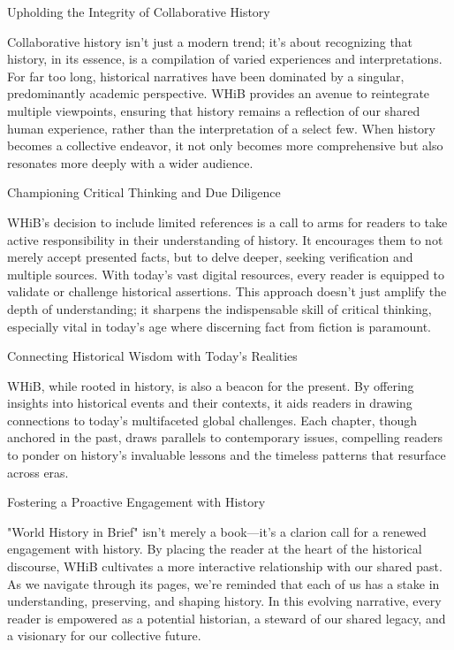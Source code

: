 \documentclass[a4paper,12pt]{book}
\begin{document}
Upholding the Integrity of Collaborative History

Collaborative history isn't just a modern trend; it's about recognizing that history, in its essence, is a compilation of varied experiences and interpretations. For far too long, historical narratives have been dominated by a singular, predominantly academic perspective. WHiB provides an avenue to reintegrate multiple viewpoints, ensuring that history remains a reflection of our shared human experience, rather than the interpretation of a select few. When history becomes a collective endeavor, it not only becomes more comprehensive but also resonates more deeply with a wider audience.

Championing Critical Thinking and Due Diligence

WHiB's decision to include limited references is a call to arms for readers to take active responsibility in their understanding of history. It encourages them to not merely accept presented facts, but to delve deeper, seeking verification and multiple sources. With today's vast digital resources, every reader is equipped to validate or challenge historical assertions. This approach doesn't just amplify the depth of understanding; it sharpens the indispensable skill of critical thinking, especially vital in today's age where discerning fact from fiction is paramount.

Connecting Historical Wisdom with Today's Realities

WHiB, while rooted in history, is also a beacon for the present. By offering insights into historical events and their contexts, it aids readers in drawing connections to today's multifaceted global challenges. Each chapter, though anchored in the past, draws parallels to contemporary issues, compelling readers to ponder on history's invaluable lessons and the timeless patterns that resurface across eras.

Fostering a Proactive Engagement with History

"World History in Brief" isn't merely a book—it's a clarion call for a renewed engagement with history. By placing the reader at the heart of the historical discourse, WHiB cultivates a more interactive relationship with our shared past. As we navigate through its pages, we're reminded that each of us has a stake in understanding, preserving, and shaping history. In this evolving narrative, every reader is empowered as a potential historian, a steward of our shared legacy, and a visionary for our collective future.
\end{document}
